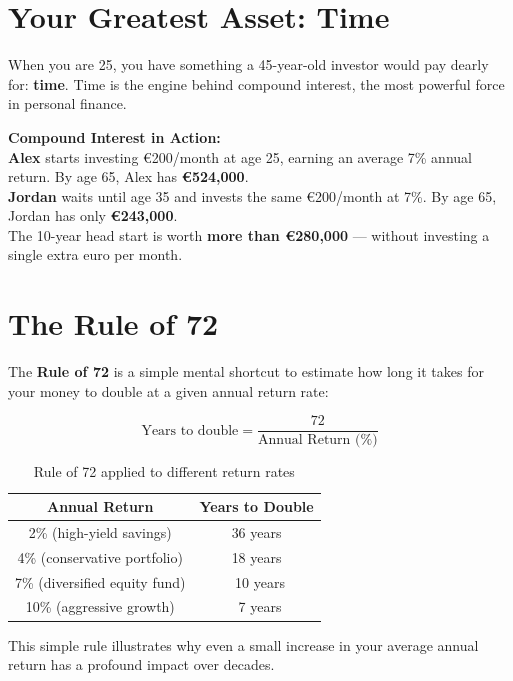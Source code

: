 \documentclass[12pt, a4paper]{book}
\begin{document}
\section{Your Greatest Asset: Time}

When you are 25, you have something a 45-year-old investor would pay dearly for: \textbf{time}. Time is the engine behind compound interest, the most powerful force in personal finance.

\begin{examplebox}
\textbf{Compound Interest in Action:}\\[4pt]
\textbf{Alex} starts investing \euro{}200/month at age 25, earning an average 7\% annual return. By age 65, Alex has \textbf{\euro{}524{,}000}.\\[4pt]
\textbf{Jordan} waits until age 35 and invests the same \euro{}200/month at 7\%. By age 65, Jordan has only \textbf{\euro{}243{,}000}.\\[4pt]
The 10-year head start is worth \textbf{more than \euro{}280{,}000} --- without investing a single extra euro per month.
\end{examplebox}

\section{The Rule of 72}

The \textbf{Rule of 72} is a simple mental shortcut to estimate how long it takes for your money to double at a given annual return rate:

\[
\text{Years to double} = \frac{72}{\text{Annual Return (\%)}}
\]

\begin{table}[h!]
\centering
\begin{tabular}{cc}
\toprule
\textbf{Annual Return} & \textbf{Years to Double} \\
\midrule
2\% (high-yield savings) & 36 years \\
4\% (conservative portfolio) & 18 years \\
7\% (diversified equity fund) & ~10 years \\
10\% (aggressive growth) & ~7 years \\
\bottomrule
\end{tabular}
\caption{Rule of 72 applied to different return rates}
\end{table}

This simple rule illustrates why even a small increase in your average annual return has a profound impact over decades.
\end{document}
